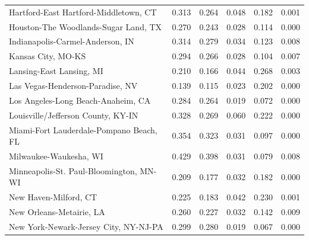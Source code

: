 \documentclass[
  10pt,
]{article}
\begin{document}
\begin{longtable}{lrrrrr}
       Hartford-East Hartford-Middletown, CT &              0.313 &              0.264 &                 0.048 &           0.182 &       0.001 \\
        Houston-The Woodlands-Sugar Land, TX &              0.270 &              0.243 &                 0.028 &           0.114 &       0.000 \\
            Indianapolis-Carmel-Anderson, IN &              0.314 &              0.279 &                 0.034 &           0.123 &       0.008 \\
                          Kansas City, MO-KS &              0.294 &              0.266 &                 0.028 &           0.104 &       0.007 \\
                    Lansing-East Lansing, MI &              0.210 &              0.166 &                 0.044 &           0.268 &       0.003 \\
            Las Vegas-Henderson-Paradise, NV &              0.139 &              0.115 &                 0.023 &           0.202 &       0.000 \\
          Los Angeles-Long Beach-Anaheim, CA &              0.284 &              0.264 &                 0.019 &           0.072 &       0.000 \\
          Louisville/Jefferson County, KY-IN &              0.328 &              0.269 &                 0.060 &           0.222 &       0.000 \\
     Miami-Fort Lauderdale-Pompano Beach, FL &              0.354 &              0.323 &                 0.031 &           0.097 &       0.000 \\
                      Milwaukee-Waukesha, WI &              0.429 &              0.398 &                 0.031 &           0.079 &       0.008 \\
     Minneapolis-St. Paul-Bloomington, MN-WI &              0.209 &              0.177 &                 0.032 &           0.182 &       0.000 \\
                       New Haven-Milford, CT &              0.225 &              0.183 &                 0.042 &           0.230 &       0.001 \\
                    New Orleans-Metairie, LA &              0.260 &              0.227 &                 0.032 &           0.142 &       0.009 \\
       New York-Newark-Jersey City, NY-NJ-PA &              0.299 &              0.280 &                 0.019 &           0.067 &       0.000 \\

\end{longtable}
\end{document}
